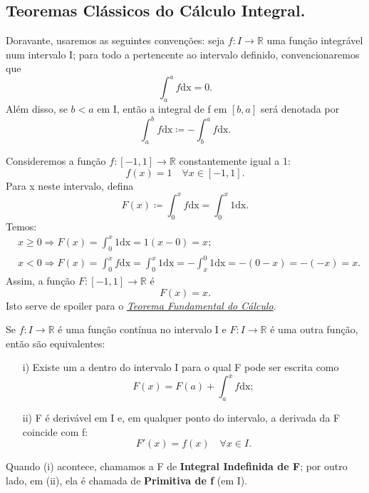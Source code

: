 \documentclass[../analysisII_notes.tex]{subfiles}
\begin{document}
\subsection{Teoremas Clássicos do Cálculo Integral.}
Doravante, usaremos as seguintes convenções: seja \(f:I\rightarrow \mathbb{R}\) uma função integrável num intervalo I; para todo a pertencente ao intervalo definido, convencionaremos que
\[
	\int_{a}^{a}f \mathrm{dx} = 0.
\]
Além disso, se \(b < a\) em I, então a integral de f em \([b, a]\) será denotada por
\[
	\int_{a}^{b}f \mathrm{dx}\coloneqq -\int_{b}^{a}f \mathrm{dx}.
\]
\begin{example}
	Consideremos a função \(f:[-1, 1]\rightarrow \mathbb{R}\) constantemente igual a 1:
	\[
		f(x) = 1 \quad  \forall x\in[-1, 1].
	\]
	Para x neste intervalo, defina
	\[
		F(x)\coloneqq \int_{0}^{x}f \mathrm{dx} = \int_{0}^{x}1 \mathrm{dx}.
	\]
	Temos:
	\begin{align*}
		 & x \geq  0 \Rightarrow F(x) = \int_{0}^{x}1 \mathrm{dx} = 1(x-0) = x;                                                            \\
		 & x < 0 \Rightarrow F(x) = \int_{0}^{x}f \mathrm{dx} = \int_{0}^{x}1 \mathrm{dx} = -\int_{x}^{0}1 \mathrm{dx} = -(0-x) = -(-x)=x.
	\end{align*}
	Assim, a função \(F:[-1, 1]\rightarrow \mathbb{R}\) é
	\[
		F(x) = x.
	\]
	Isto serve de spoiler para o \hyperlink{ftc}{\textit{Teorema Fundamental do Cálculo}}.
\end{example}
\hypertarget{ftc}{
	\begin{theorem*}
		Se \(f:I\rightarrow \mathbb{R}\) é uma função contínua no intervalo I e \(F:I\rightarrow \mathbb{R}\) é uma outra função, então são equivalentes:
		\begin{itemize}
			\item[i)] Existe um a dentro do intervalo I para o qual F pode ser escrita como
			      \[
				      F(x) = F(a) + \int_{a}^{x}f \mathrm{dx};
			      \]
			\item[ii)] F é derivável em I e, em qualquer ponto do intervalo, a derivada da F coincide com f:
			      \[
				      F'(x) = f(x) \quad \forall x\in I.
			      \]
		\end{itemize}
		Quando (i) acontece, chamamos a F de \textbf{Integral Indefinida de F}; por outro lado, em (ii), ela é chamada de \textbf{Primitiva de f} (em I).
	\end{theorem*}
}
\end{document}
